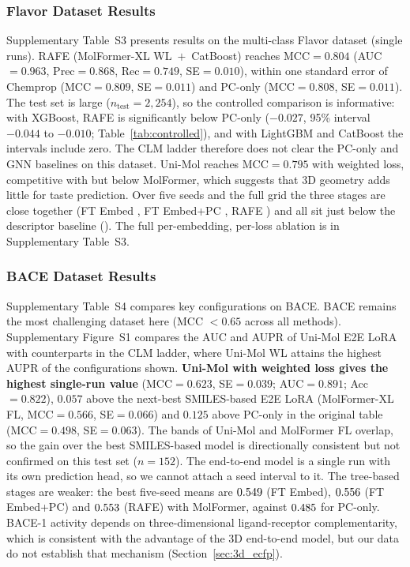 \documentclass[pdflatex,sn-mathphys-num,Numbered]{sn-jnl}%
\begin{document}
\subsubsection{Flavor Dataset Results}
Supplementary Table~S3 presents results on the multi-class Flavor dataset (single runs). RAFE (MolFormer-XL WL~$+$~CatBoost) reaches MCC$=0.804$ (AUC$=0.963$, Prec$=0.868$, Rec$=0.749$, SE$=0.010$), within one standard error of Chemprop (MCC$=0.809$, SE$=0.011$) and PC-only (MCC$=0.808$, SE$=0.011$). The test set is large ($n_\text{test}=2{,}254$), so the controlled comparison is informative: with XGBoost, RAFE is significantly below PC-only ($-0.027$, 95\% interval $-0.044$ to $-0.010$; Table~\ref{tab:controlled}), and with LightGBM and CatBoost the intervals include zero. The CLM ladder therefore does not clear the PC-only and GNN baselines on this dataset. Uni-Mol reaches MCC$=0.795$ with weighted loss, competitive with but below MolFormer, which suggests that 3D geometry adds little for taste prediction. Over five seeds and the full grid the three stages are close together (FT Embed \mFLAVFT{}, FT Embed+PC \mFLAVFTPC{}, RAFE \mFLAVRAFE{}) and all sit just below the descriptor baseline (\mFLAVPC{}). The full per-embedding, per-loss ablation is in Supplementary Table~S3.

\FloatBarrier
\subsubsection{BACE Dataset Results}
Supplementary Table~S4 compares key configurations on BACE. BACE remains the most challenging dataset here (MCC $< 0.65$ across all methods). Supplementary Figure~S1 compares the AUC and AUPR of Uni-Mol E2E LoRA with counterparts in the CLM ladder, where Uni-Mol WL attains the highest AUPR of the configurations shown. \textbf{Uni-Mol with weighted loss gives the highest single-run value} (MCC$=0.623$, SE$=0.039$; AUC$=0.891$; Acc$=0.822$), $0.057$ above the next-best SMILES-based E2E LoRA (MolFormer-XL FL, MCC$=0.566$, SE$=0.066$) and $0.125$ above PC-only in the original table (MCC$=0.498$, SE$=0.063$). The bands of Uni-Mol and MolFormer FL overlap, so the gain over the best SMILES-based model is directionally consistent but not confirmed on this test set ($n=152$). The end-to-end model is a single run with its own prediction head, so we cannot attach a seed interval to it. The tree-based stages are weaker: the best five-seed means are $0.549$ (FT Embed), $0.556$ (FT Embed+PC) and $0.553$ (RAFE) with MolFormer, against $0.485$ for PC-only. BACE-1 activity depends on three-dimensional ligand-receptor complementarity, which is consistent with the advantage of the 3D end-to-end model, but our data do not establish that mechanism (Section~\ref{sec:3d_ecfp}).
\end{document}
